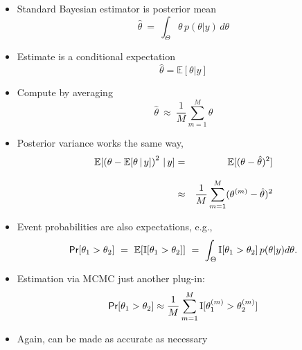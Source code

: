 \documentclass[10pt]{report}
\begin{document}
\begin{itemize}
\item Standard Bayesian estimator is posterior mean
\[
\hat{\theta}  \ =  \ \int_{\Theta} \theta \, p(\theta|y) \, d\theta
\]
\item Estimate is a conditional expectation
\[
\hat{\theta} = \mathbb{E}[\theta|y]
\]
\item Compute by averaging
\[
\hat{\theta} \ \approx \ \frac{1}{M} \sum_{m=1}^M \theta
\]
\end{itemize}

\begin{itemize}
\item Posterior variance works the same way, 
\begin{eqnarray*}
\displaystyle
\mathbb{E}[\left(\theta - \mathbb{E}[\theta \, | \, y]\right)^2 \, | \, y]
& = &
\displaystyle
\mathbb{E}[(\theta - \hat{\theta})^2]
\\[8pt]
& \approx & 
\displaystyle
\frac{1}{M} \sum_{m=1}^M (\theta^{(m)} - \hat{\theta})^2
\end{eqnarray*}
\end{itemize}

%
\begin{itemize}
\item Event probabilities are also expectations, e.g.,
\[
\text{\sf Pr}[\theta_1 > \theta_2]
\ = \ \mathbb{E}[\text{I}[\theta_1 > \theta_2]]
\ = \ \int_{\Theta} \text{I}[\theta_1 > \theta_2] \, p(\theta|y) d\theta.
\]
\item Estimation via MCMC just another plug-in:
\[
\text{\sf Pr}[\theta_1 > \theta_2] \approx 
\frac{1}{M} \sum_{m=1}^M \text{I}[\theta_1^{(m)} > \theta_2^{(m)}]
\]
\item Again, can be made as accurate as necessary
\end{itemize}
\end{document}
